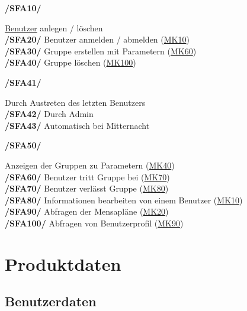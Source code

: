\documentclass[a4paper]{scrreprt}
\begin{document}
\begin{addmargin}[25pt]{0pt} 
\hypertarget{sfa10}{\textbf{/SFA10/}} \hyperlink{benutzer}{Benutzer} anlegen / löschen\\
\hypertarget{sfa20}{\textbf{/SFA20/}} Benutzer anmelden / abmelden (\hyperlink{mk10}{MK10})\\
\hypertarget{sfa30}{\textbf{/SFA30/}} Gruppe erstellen mit Parametern (\hyperlink{mk60}{MK60})\\
\hypertarget{sfa40}{\textbf{/SFA40/}} Gruppe löschen (\hyperlink{mk100}{MK100})\\
	\begin{addmargin}[25pt]{0pt} 
	\hypertarget{sfa41}{\textbf{/SFA41/}} Durch Austreten des letzten Benutzers\\
	\hypertarget{sfa42}{\textbf{/SFA42/}} Durch Admin\\
	\hypertarget{sfa43}{\textbf{/SFA43/}} Automatisch bei Mitternacht\\
	\end{addmargin}
\hypertarget{sfa50}{\textbf{/SFA50/}} Anzeigen der Gruppen zu Parametern (\hyperlink{m40}{MK40})\\
\hypertarget{sfa60}{\textbf{/SFA60/}} Benutzer tritt Gruppe bei (\hyperlink{m70}{MK70})\\
\hypertarget{sfa70}{\textbf{/SFA70/}} Benutzer verlässt Gruppe (\hyperlink{m80}{MK80})\\
\hypertarget{sfa80}{\textbf{/SFA80/}} Informationen bearbeiten von einem Benutzer (\hyperlink{m10}{MK10})\\
\hypertarget{sfa90}{\textbf{/SFA90/}} Abfragen der Mensapläne (\hyperlink{m20}{MK20})\\
\hypertarget{sfa100}{\textbf{/SFA100/}} Abfragen von Benutzerprofil (\hyperlink{m90}{MK90})\\
\end{addmargin}

\chapter{Produktdaten}

\section{Benutzerdaten}
\end{document}
